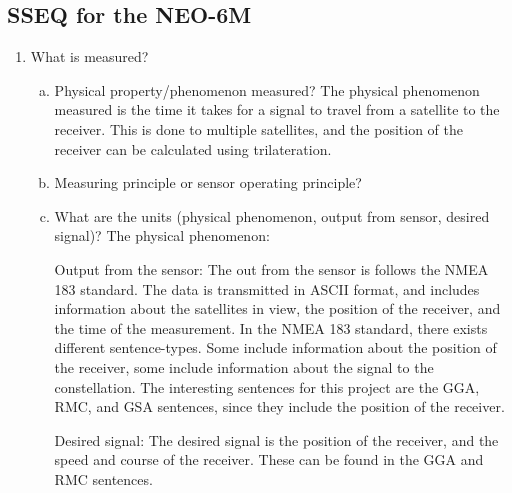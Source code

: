 \subsection{SSEQ for the NEO-6M}
\begin{enumerate}
    \item What is measured?
        \begin{enumerate}[(a)]
            \item Physical property/phenomenon measured?
            The physical phenomenon measured is the time it takes for a signal to travel from a satellite to the receiver.
            This is done to multiple satellites, and the position of the receiver can be calculated using trilateration.

            \item Measuring principle or sensor operating principle?
            \item What are the units (physical phenomenon, output from sensor, desired signal)?
            The physical phenomenon: 
            
            Output from the sensor:
            The out from the sensor is follows the NMEA 183 standard. The data is transmitted in ASCII format, and includes information about the satellites in view, the position of the receiver, and the time of the measurement.
            In the NMEA 183 standard, there exists different sentence-types. Some include information about the position of the receiver, some include information about the signal to the constellation.
            The interesting sentences for this project are the GGA, RMC, and GSA sentences, since they include the position of the receiver. %


            Desired signal:
            The desired signal is the position of the receiver, and the speed and course of the receiver.
            These can be found in the GGA and RMC sentences.%


\end{enumerate}
\end{enumerate}
